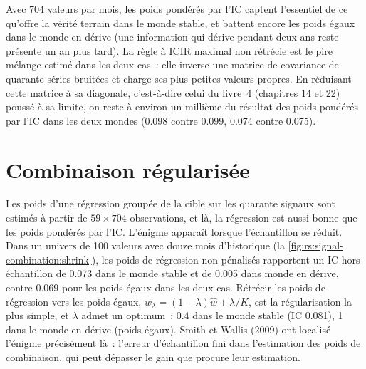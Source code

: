 Avec 704 valeurs par mois, les poids pondérés par l'IC captent l'essentiel de ce qu'offre la vérité terrain dans le monde stable, et battent encore les poids égaux dans le
monde en dérive (une information qui dérive pendant deux ans reste présente un an plus tard). La règle à ICIR maximal non rétrécie est le pire mélange estimé dans les deux cas~:
elle inverse une matrice de covariance de quarante séries bruitées et charge ses plus petites valeurs propres. En réduisant cette matrice à sa diagonale, c'est-à-dire celui du livre~4 (chapitres 14 et 22) poussé à sa limite, on reste à environ un millième du résultat des poids pondérés par l'IC dans les deux mondes (0.098 contre 0.099, 0.074 contre 0.075).

\section{Combinaison régularisée}

Les poids d'une régression groupée de la cible sur les quarante signaux sont estimés à partir de $59 \times 704$ observations, et là, la
régression est aussi bonne que les poids pondérés par l'IC. L'énigme apparaît lorsque l'échantillon se réduit. Dans un univers de 100 valeurs avec douze mois d'historique
(la \cref{fig:rs:signal-combination:shrink}), les poids de régression non pénalisés rapportent un IC hors échantillon de 0.073 dans le monde stable et de 0.005 dans
monde en dérive, contre 0.069 pour les poids égaux dans les deux cas. Rétrécir les poids de régression vers les poids égaux,
$w_\lambda = (1 - \lambda)\hat w + \lambda/K$, est la régularisation la plus simple, et $\lambda$ admet un optimum~: 0.4 dans le monde stable (IC 0.081),
1 dans le monde en dérive (poids égaux). Smith et Wallis (2009) ont localisé l'énigme précisément là~: l'erreur d'échantillon fini dans l'estimation des
poids de combinaison, qui peut dépasser le gain que procure leur estimation.

